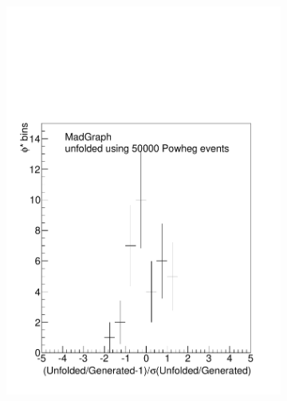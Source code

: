 \begin{figure}[!htbp]
\begin{subfigure}[b]{\SideBySidePlotWidth}
        \includegraphics[width=\textwidth]{figures/Pull_50000.pdf}
        \caption{}
        \label{fig:pull_50000}
    \end{subfigure}
    \begin{subfigure}[b]{\SideBySidePlotWidth}

\end{subfigure}
\end{figure}

